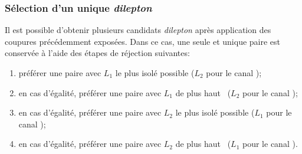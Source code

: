 \subsubsection{Sélection d'un unique \emph{dilepton}}\label{chapter-HTT_analysis-section-offline-dilepton}
Il est possible d'obtenir plusieurs candidats \emph{dilepton} après application des coupures précédemment exposées.
Dans ce cas, une seule et unique paire est conservée à l'aide des étapes de réjection suivantes:
\begin{enumerate}
    \item préférer une paire avec $L_1$ le plus isolé possible ($L_2$ pour le canal \ele\mu);
    \item en cas d'égalité, préférer une paire avec $L_1$ de plus haut \pT\ ($L_2$ pour le canal \ele\mu);
    \item en cas d'égalité, préférer une paire avec $L_2$ le plus isolé possible ($L_1$ pour le canal \ele\mu);
    \item en cas d'égalité, préférer une paire avec $L_2$ de plus haut \pT\ ($L_1$ pour le canal \ele\mu).
\end{enumerate}